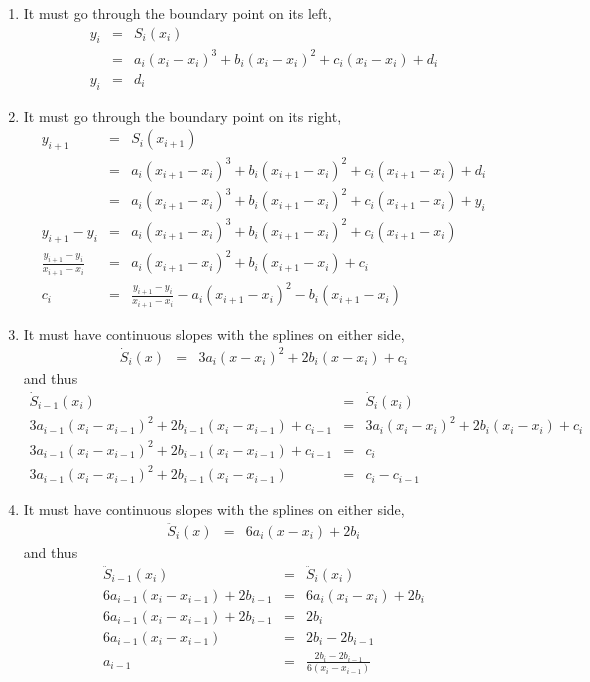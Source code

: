 \begin{enumerate}
\item It must go through the boundary point on its left,
      \begin{eqnarray}
        y_i
        &=&S_i(x_i)\\
        &=&a_i(x_i-x_i)^3+b_i(x_i-x_i)^2+c_i(x_i-x_i)+d_i\\
        y_i&=&d_i
      \end{eqnarray}
\item It must go through the boundary point on its right,
      \begin{eqnarray}
        y_{i+1}
        &=&S_i(x_{i+1})\\
        &=&a_i(x_{i+1}-x_i)^3+b_i(x_{i+1}-x_i)^2+c_i(x_{i+1}-x_i)+d_i\\
        &=&a_i(x_{i+1}-x_i)^3+b_i(x_{i+1}-x_i)^2+c_i(x_{i+1}-x_i)+y_i\\
        y_{i+1}-y_i&=&a_i(x_{i+1}-x_i)^3+b_i(x_{i+1}-x_i)^2+c_i(x_{i+1}-x_i)\\
        \frac{y_{i+1}-y_i}{x_{i+1}-x_i}&=&a_i(x_{i+1}-x_i)^2+b_i(x_{i+1}-x_i)+c_i\\
        c_i&=&\frac{y_{i+1}-y_i}{x_{i+1}-x_i}-a_i(x_{i+1}-x_i)^2-b_i(x_{i+1}-x_i)
      \end{eqnarray}
\item It must have continuous slopes with the splines on either side,
      \begin{eqnarray}
        \dot S_i(x)
        &=&3a_i(x-x_i)^2+2b_i(x-x_i)+c_i
      \end{eqnarray}
      and thus
      \begin{eqnarray}
        \dot S_{i-1}(x_i) &=& \dot S_i(x_i) \\
        3a_{i-1}(x_i-x_{i-1})^2+2b_{i-1}(x_i-x_{i-1})+c_{i-1}&=&3a_i(x_i-x_i)^2+2b_i(x_i-x_i)+c_i \\
        3a_{i-1}(x_i-x_{i-1})^2+2b_{i-1}(x_i-x_{i-1})+c_{i-1}&=&c_i \\
        3a_{i-1}(x_i-x_{i-1})^2+2b_{i-1}(x_i-x_{i-1})&=&c_i-c_{i-1}
      \end{eqnarray}
\item It must have continuous slopes with the splines on either side,
      \begin{eqnarray}
        \ddot S_i(x)
        &=&6a_i(x-x_i)+2b_i
      \end{eqnarray}
      and thus
      \begin{eqnarray}
        \ddot S_{i-1}(x_i) &=& \ddot S_i(x_i) \\
        6a_{i-1}(x_i-x_{i-1})+2b_{i-1}&=&6a_i(x_i-x_i)+2b_i \\
        6a_{i-1}(x_i-x_{i-1})+2b_{i-1}&=&2b_i \\
        6a_{i-1}(x_i-x_{i-1})&=&2b_i-2b_{i-1} \\
        a_{i-1}&=&\frac{2b_i-2b_{i-1}}{6(x_i-x_{i-1})}
       \end{eqnarray}
\end{enumerate}
